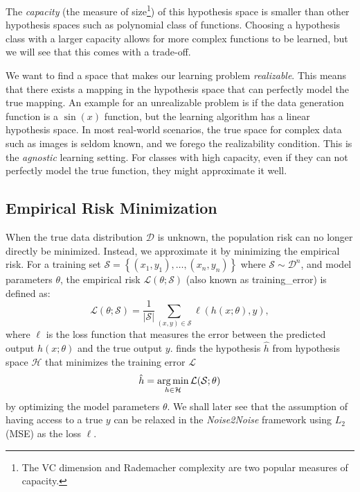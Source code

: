 The \textit{capacity} (the measure of size\footnote{The VC dimension and Rademacher complexity are two popular measures of capacity.}) of this hypothesis space is smaller than other  hypothesis spaces such as polynomial class of functions. Choosing a hypothesis class with a larger capacity allows for more complex functions to be learned, but we will see that this comes with a trade-off.

We want to find a space that makes our learning problem \textit{realizable}. This means that there exists a mapping  in the hypothesis space that can perfectly model the true mapping. An example for an unrealizable problem is if the data generation function is a $\sin(x)$ function, but the learning algorithm has a linear hypothesis space. In most real-world scenarios, the true space for complex data such as images is seldom known, and we forego the realizability condition. This is the \textit{agnostic} learning setting. For classes with high capacity, even if they can not perfectly model the true function, they might approximate it well.

\subsection{Empirical Risk Minimization}\label{sec:erm}
When the true data distribution $\mathcal{D}$ is unknown, the population risk can no longer directly be minimized. Instead, we approximate it by minimizing the empirical risk. For a training set $\mathcal{S} = \left\{ (x_1, y_1), \ldots, (x_n, y_n) \right\}$ where $\mathcal{S} \sim \mathcal{D}^n$, and model parameters $\theta$, the empirical risk $\mathcal{L}(\theta; \mathcal{S})$ (also known as \gls{training_error}) is defined as:
\begin{equation}
    \mathcal{L}(\theta; \mathcal{S}) = \frac{1}{\lvert \mathcal{S} \rvert} \sum_{(x, y) \in \mathcal{S}} \ell(h(x; \theta), y),
\end{equation}
where $\ell$ is the loss function that measures the error between the predicted output $h(x; \theta)$ and the true output $y$.  finds the hypothesis $\hat{h}$ from hypothesis space $\mathcal{H}$ that minimizes the training error $\mathcal{L}$
\begin{equation}\label{eq:erm}
    \hat{h} = \operatorname*{arg\,min}_{h \in \mathcal{H}} \mathcal{L}(\mathcal{S};\theta)
\end{equation}
by optimizing the model parameters $\theta$.
We shall later see that the assumption of having access to a true $y$ can be relaxed in the \textit{Noise2Noise} framework using $L_2$ (\gls{MSE}) as the loss $\ell$.

